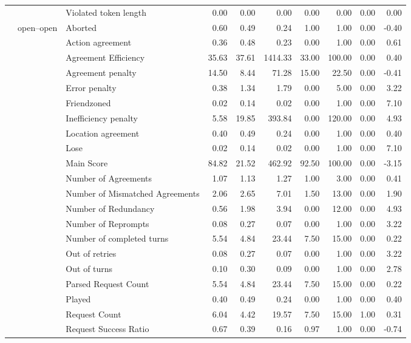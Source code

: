 \begin{tabular}{lllrrrrrrr}
 &  & Violated token length & 0.00 & 0.00 & 0.00 & 0.00 & 0.00 & 0.00 & 0.00 \\
\cline{2-10}
 & \multirow[t]{27}{*}{open--open} & Aborted & 0.60 & 0.49 & 0.24 & 1.00 & 1.00 & 0.00 & -0.40 \\
 &  & Action agreement & 0.36 & 0.48 & 0.23 & 0.00 & 1.00 & 0.00 & 0.61 \\
 &  & Agreement Efficiency & 35.63 & 37.61 & 1414.33 & 33.00 & 100.00 & 0.00 & 0.40 \\
 &  & Agreement penalty & 14.50 & 8.44 & 71.28 & 15.00 & 22.50 & 0.00 & -0.41 \\
 &  & Error penalty & 0.38 & 1.34 & 1.79 & 0.00 & 5.00 & 0.00 & 3.22 \\
 &  & Friendzoned & 0.02 & 0.14 & 0.02 & 0.00 & 1.00 & 0.00 & 7.10 \\
 &  & Inefficiency penalty & 5.58 & 19.85 & 393.84 & 0.00 & 120.00 & 0.00 & 4.93 \\
 &  & Location agreement & 0.40 & 0.49 & 0.24 & 0.00 & 1.00 & 0.00 & 0.40 \\
 &  & Lose & 0.02 & 0.14 & 0.02 & 0.00 & 1.00 & 0.00 & 7.10 \\
 &  & Main Score & 84.82 & 21.52 & 462.92 & 92.50 & 100.00 & 0.00 & -3.15 \\
 &  & Number of Agreements & 1.07 & 1.13 & 1.27 & 1.00 & 3.00 & 0.00 & 0.41 \\
 &  & Number of Mismatched Agreements & 2.06 & 2.65 & 7.01 & 1.50 & 13.00 & 0.00 & 1.90 \\
 &  & Number of Redundancy & 0.56 & 1.98 & 3.94 & 0.00 & 12.00 & 0.00 & 4.93 \\
 &  & Number of Reprompts & 0.08 & 0.27 & 0.07 & 0.00 & 1.00 & 0.00 & 3.22 \\
 &  & Number of completed turns & 5.54 & 4.84 & 23.44 & 7.50 & 15.00 & 0.00 & 0.22 \\
 &  & Out of retries & 0.08 & 0.27 & 0.07 & 0.00 & 1.00 & 0.00 & 3.22 \\
 &  & Out of turns & 0.10 & 0.30 & 0.09 & 0.00 & 1.00 & 0.00 & 2.78 \\
 &  & Parsed Request Count & 5.54 & 4.84 & 23.44 & 7.50 & 15.00 & 0.00 & 0.22 \\
 &  & Played & 0.40 & 0.49 & 0.24 & 0.00 & 1.00 & 0.00 & 0.40 \\
 &  & Request Count & 6.04 & 4.42 & 19.57 & 7.50 & 15.00 & 1.00 & 0.31 \\
 &  & Request Success Ratio & 0.67 & 0.39 & 0.16 & 0.97 & 1.00 & 0.00 & -0.74 \\

\end{tabular}
